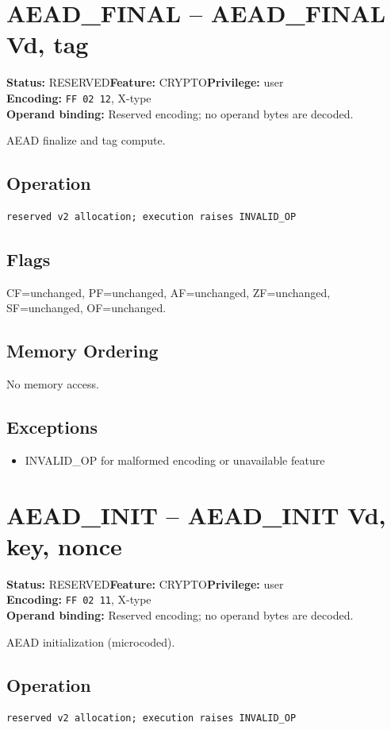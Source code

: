 \documentclass[10pt]{article}
\begin{document}
\section{AEAD\_FINAL -- AEAD\_FINAL Vd, tag}
\textbf{Status:} RESERVED\quad \textbf{Feature:} CRYPTO\quad \textbf{Privilege:} user\\
\textbf{Encoding:} \texttt{FF 02 12}, X-type\\
\textbf{Operand binding:} Reserved encoding; no operand bytes are decoded.

AEAD finalize and tag compute.

\subsection*{Operation}
\begin{lstlisting}
reserved v2 allocation; execution raises INVALID_OP
\end{lstlisting}
\subsection*{Flags}
CF=unchanged, PF=unchanged, AF=unchanged, ZF=unchanged, SF=unchanged, OF=unchanged.
\subsection*{Memory Ordering}
No memory access.
\subsection*{Exceptions}
\begin{itemize}
\item INVALID\_OP for malformed encoding or unavailable feature
\end{itemize}
\clearpage

\section{AEAD\_INIT -- AEAD\_INIT Vd, key, nonce}
\textbf{Status:} RESERVED\quad \textbf{Feature:} CRYPTO\quad \textbf{Privilege:} user\\
\textbf{Encoding:} \texttt{FF 02 11}, X-type\\
\textbf{Operand binding:} Reserved encoding; no operand bytes are decoded.

AEAD initialization (microcoded).

\subsection*{Operation}
\begin{lstlisting}
reserved v2 allocation; execution raises INVALID_OP
\end{lstlisting}
\end{document}
